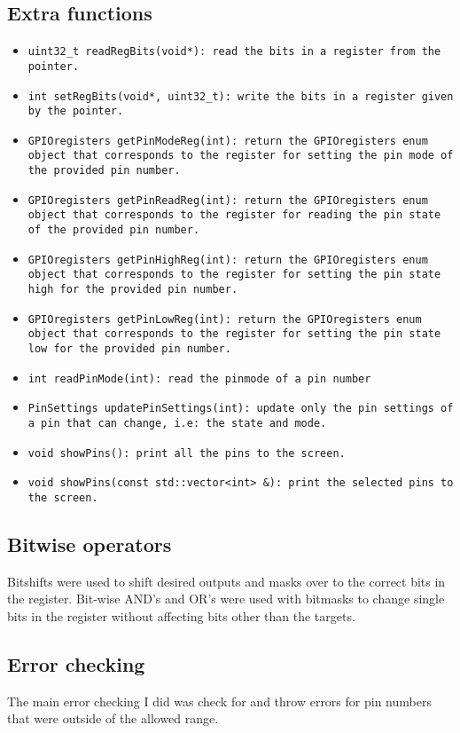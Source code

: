 \documentclass{article}
\begin{document}
\subsection{Extra functions}
\begin{itemize}
	\item \texttt{uint32_t readRegBits(void*): read the bits in a register from the pointer.}
	\item \texttt{int setRegBits(void*, uint32_t): write the bits in a register given by the pointer.}
	\item \texttt{GPIOregisters getPinModeReg(int): return the GPIOregisters enum object that corresponds to the register for setting the pin mode of the provided pin number.}
	\item \texttt{GPIOregisters getPinReadReg(int): return the GPIOregisters enum object that corresponds to the register for reading the pin state of the provided pin number.}
	\item \texttt{GPIOregisters getPinHighReg(int): return the GPIOregisters enum object that corresponds to the register for setting the pin state high for the provided pin number.}
	\item \texttt{GPIOregisters getPinLowReg(int): return the GPIOregisters enum object that corresponds to the register for setting the pin state low for the provided pin number.}
	\item \texttt{int readPinMode(int): read the pinmode of a pin number}
	\item \texttt{PinSettings updatePinSettings(int): update only the pin settings of a pin that can change, i.e: the state and mode.}
	\item \texttt{void showPins(): print all the pins to the screen.}
	\item \texttt{void showPins(const std::vector<int> \&): print the selected pins to the screen.}
\end{itemize}

\subsection{Bitwise operators}
Bitshifts were used to shift desired outputs and masks over to the correct bits in the register. Bit-wise AND's and OR's were used with bitmasks to change single bits in the register without affecting bits other than the targets.

\subsection{Error checking}
The main error checking I did was check for and throw errors for pin numbers that were outside of the allowed range.
\end{document}
